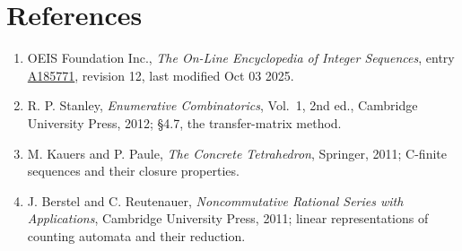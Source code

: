 \documentclass[11pt]{article}
\theoremstyle{definition}
\begin{document}
\section{References}

\begin{enumerate}

\item OEIS Foundation Inc., \emph{The On-Line Encyclopedia of Integer Sequences}, entry \href{https://oeis.org/A185771}{A185771}, revision 12, last modified Oct 03 2025.

\item R. P. Stanley, \emph{Enumerative Combinatorics}, Vol.~1, 2nd ed., Cambridge University Press, 2012; \S4.7, the transfer-matrix method.

\item M. Kauers and P. Paule, \emph{The Concrete Tetrahedron}, Springer, 2011; C-finite sequences and their closure properties.

\item J. Berstel and C. Reutenauer, \emph{Noncommutative Rational Series with Applications}, Cambridge University Press, 2011; linear representations of counting automata and their reduction.

\end{enumerate}
\end{document}
